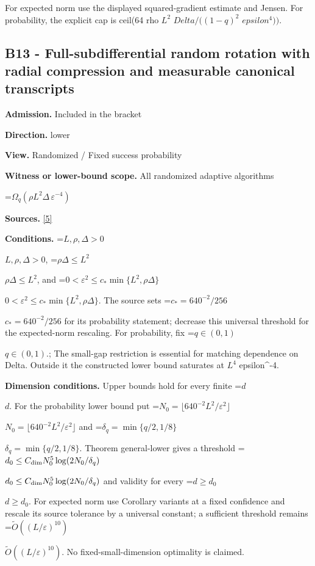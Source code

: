 \documentclass[10pt,a4paper]{article}
\newcommand{\AtlasMath}[1]{\par\begingroup\centering\setbox0=\hbox{$\displaystyle #1$}\ifdim\wd0>1.4\linewidth\typeout{ATLAS WIDE FORMULA: \the\wd0}\fi\ifdim\wd0>\linewidth\resizebox{\linewidth}{!}{\box0}\else\box0\fi\par\endgroup}
\newcommand{\AtlasInlineMath}[1]{\begingroup\setbox0=\hbox{$#1$}\ifdim\wd0>.4\linewidth\endgroup\AtlasMath{#1}\else\endgroup$#1$\fi}
\begin{document}
For expected norm use the displayed squared-gradient estimate and Jensen. For probability, the explicit cap is ceil(64 rho $L^2$ $Delta/((1-q)^2$ $epsilon^4))$.



\subsection{B13 - Full-subdifferential random rotation with radial compression and measurable canonical transcripts}


\textbf{Admission.} Included in the bracket



\textbf{Direction.} lower



\textbf{View.} Randomized / Fixed success probability



\textbf{Witness or lower-bound scope.} All randomized adaptive algorithms



\AtlasMath{\Omega_q(\rho L^2\Delta\,\varepsilon^{-4})}


\textbf{Sources.} \href{https://github.com/WU-Wendao/Colombo/blob/main/colombo_sensorium/Complexity_altas/data/sources/colombo/N01/manuscript.pdf}{[5]}



\textbf{Conditions.} \AtlasInlineMath{L,\rho,\Delta>0}, \AtlasInlineMath{\rho\Delta\le L^2}, and \AtlasInlineMath{0<\varepsilon^2\le c_*\min\{L^2,\rho\Delta\}}. The source sets \AtlasInlineMath{c_*=640^{-2}/256} for its probability statement; decrease this universal threshold for the expected-norm rescaling. For probability, fix \AtlasInlineMath{q\in(0,1)}.; The small-gap restriction is essential for matching dependence on Delta. Outside it the constructed lower bound saturates at $L^4$ epsilon\textasciicircum{}-4.



\textbf{Dimension conditions.} Upper bounds hold for every finite \AtlasInlineMath{d}. For the probability lower bound put \AtlasInlineMath{N_0=\lfloor640^{-2}L^2/\varepsilon^2\rfloor} and \AtlasInlineMath{\delta_q=\min\{q/2,1/8\}}. Theorem general-lower gives a threshold \AtlasInlineMath{d_0\le C_{\rm dim}N_0^5\log(2N_0/\delta_q)} and validity for every \AtlasInlineMath{d\ge d_0}. For expected norm use Corollary variants at a fixed confidence and rescale its source tolerance by a universal constant; a sufficient threshold remains \AtlasInlineMath{\widetilde O((L/\varepsilon)^{10})}. No fixed-small-dimension optimality is claimed.
\end{document}
